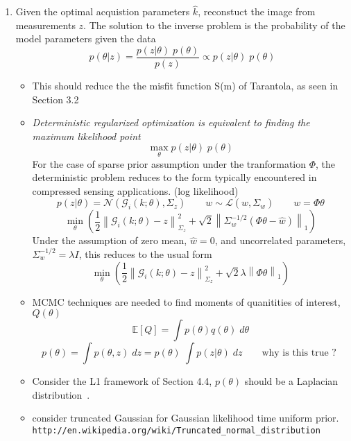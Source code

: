 \documentclass[10pt]{amsart}
\begin{document}
\begin{enumerate}
\begin{itemize}
\end{itemize} 


\item Given the optimal acquistion parameters $\hat{k}$, reconstuct the
image from measurements $z$. The solution to the inverse problem is the
probability of the model parameters given the data
\[
   p(\theta|z) = \frac{ p(z|\theta) \; p(\theta)} {p(z)} 
               \propto  p(z|\theta) \; p(\theta)
\]
\begin{itemize}
\item This should reduce the the misfit function S(m) of Tarantola,
as seen in \cite{tarantola05} Section 3.2
\item \textit{Deterministic regularized optimization is equivalent to finding the
maximum likelihood point}
\[
  \max_\theta p(z|\theta) \; p(\theta)
\]
For the case of sparse prior assumption under the tranformation $\Phi$,
the deterministic problem reduces to the form typically encountered in
compressed sensing applications. (log likelihood)
\[
      p(z|\theta) =  \mathcal{N}(\mathcal{G}_i(k;\theta),\Sigma_z) 
    \qquad
     w \sim \mathcal{L}(\hat{w},\Sigma_w)  
    \qquad
   w = \Phi \theta
\]
\[
  \min_\theta 
   \left(
       \frac{1}{2}  
        \left\| 
         \mathcal{G}_i(k;\theta) - z 
        \right\|^2_{\Sigma_z}  
        +\sqrt{2} 
          \left\| 
        \Sigma_w^{-1/2} \left(\Phi \theta - \hat{w}\right)
         \right\|_1
   \right)
\]
Under the assumption of zero mean, $\hat{w} = 0$, and uncorrelated
parameters, $\Sigma_w^{-1/2} =\lambda I$, this
reduces to the usual form
\[
  \min_\theta 
   \left(
       \frac{1}{2}  
        \left\| 
         \mathcal{G}_i(k;\theta) - z 
        \right\|^2_{\Sigma_z}  
        +\sqrt{2} \lambda 
          \left\| \Phi \theta \right\|_1
   \right)
\]
\item MCMC techniques are needed to find moments of quanitities of interest,
$Q(\theta)$
\[
   \mathbb{E}[Q] = \int p(\theta) q(\theta) \; d\theta
\]
{\color{red}
\[
  p(\theta) = \int  p(\theta,z)  \; dz
            = p(\theta)\;  \int  p(z|\theta) \; dz
  \qquad \text {why is this true ? }
\]
}
\item Consider the L1 framework of \cite{tarantola05} Section 4.4,
      $p(\theta)$  should be a Laplacian distribution~\cite{Eltoft2006,Babacan2010}.
\item consider truncated Gaussian for Gaussian likelihood time uniform prior.
 \texttt{http://en.wikipedia.org/wiki/Truncated\_normal\_distribution}
\end{itemize}


\end{enumerate}
\end{document}
